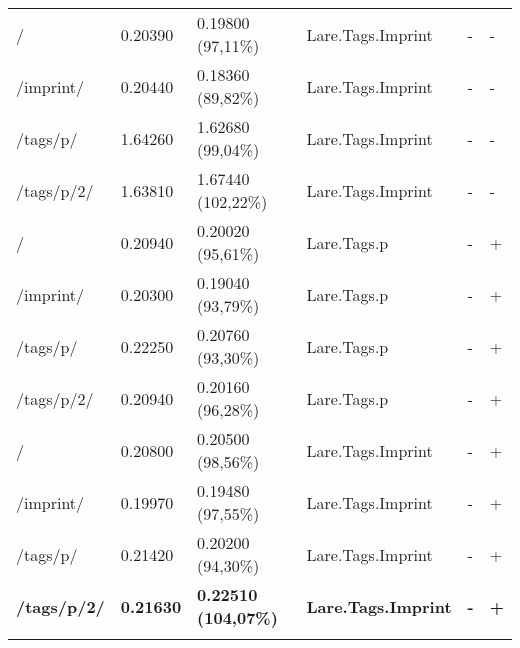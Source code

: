 \begin{appendix}
\begin{center}
\begin{longtable}{llllll}
	\hline
	/ & 0.20390 & 0.19800 (97,11\%) & Lare.Tags.Imprint & - & - \\
	/imprint/ & 0.20440 & 0.18360 (89,82\%) & Lare.Tags.Imprint & - & - \\
	/tags/p/ & 1.64260 & 1.62680 (99,04\%) & Lare.Tags.Imprint & - & - \\
	/tags/p/2/ & 1.63810 & 1.67440 (102,22\%) & Lare.Tags.Imprint & - & - \\
	\hline
	\hline
	/ & 0.20940 & 0.20020 (95,61\%) & Lare.Tags.p & - & + \\
	/imprint/ & 0.20300 & 0.19040 (93,79\%) & Lare.Tags.p & - & + \\
	/tags/p/ & 0.22250 & 0.20760 (93,30\%) & Lare.Tags.p & - & + \\
	/tags/p/2/ & 0.20940 & 0.20160 (96,28\%) & Lare.Tags.p & - & + \\
	\hline
	/ & 0.20800 & 0.20500 (98,56\%) & Lare.Tags.Imprint & - & + \\
	/imprint/ & 0.19970 & 0.19480 (97,55\%) & Lare.Tags.Imprint & - & + \\
	/tags/p/ & 0.21420 & 0.20200 (94,30\%) & Lare.Tags.Imprint & - & + \\
	\textbf{/tags/p/2/} & \textbf{0.21630} & \textbf{0.22510 (104,07\%)} & \textbf{Lare.Tags.Imprint} & \textbf{-} & \textbf{+} \\
	\hline
\label{tab:curl_results_external}
\end{longtable}
\end{center}

\newpage{}


\end{appendix}
